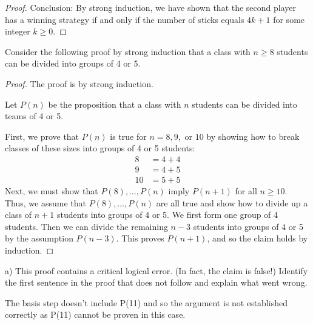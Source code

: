 \documentclass[a4paper]{exam}
\begin{document}
\begin{questions}
\begin{solution}
\begin{proof}
Conclusion:
By strong induction, we have shown that the second player has a winning strategy if and only if the number of sticks equals $4k + 1$ for some integer $k \geq 0$.

    \end{proof}
  \end{solution}
  
  \question 
  Consider the following proof by strong induction that a class with \( n \geq 8 \) students can be divided into groups of 4 or 5.

  \begin{mdframed}
    \begin{proof} The proof is by strong induction.

      Let \( P(n) \) be the proposition that a class with \( n \) students can be divided into teams of 4 or 5.

      First, we prove that \( P(n) \) is true for \( n = 8, 9, \) or \( 10 \) by showing how to break classes of these sizes into groups of 4 or 5 students:
      \begin{align*}
8  &= 4 + 4 \\
9  &= 4 + 5 \\
10 &= 5 + 5 
      \end{align*}
Next, we must show that \( P(8), \ldots, P(n) \) imply \( P(n + 1) \) for all \( n \geq 10 \). Thus, we assume that \( P(8), \ldots, P(n) \) are all true and show how to divide up a class of \( n + 1 \) students into groups of 4 or 5. We first form one group of 4 students. Then we can divide the remaining \( n-3 \) students into groups of 4 or 5 by the assumption \( P(n-3) \). This proves \( P(n+1) \), and so the claim holds by induction.
\end{proof}
\end{mdframed}

a)
This proof contains a critical logical error. (In fact, the claim is false!) Identify the first sentence in the proof that does not follow and explain what went wrong.
  \begin{solution}
    The basis step doesn’t include P(11) and so the argument is not established
correctly as P(11) cannot be proven in this case.


\end{solution}
\end{questions}
\end{document}
